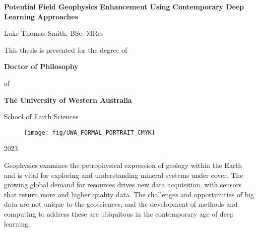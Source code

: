 \documentclass[12pt,a4paper]{report} %
\begin{document}
\begin{titlepage}

    \begin{center}
        \large{\textbf{Potential Field Geophysics Enhancement Using Contemporary Deep Learning Approaches}}

        \vspace{15 mm}
        {\large{Luke Thomas Smith, BSc, MRes}}

        \vspace{15 mm}
        This thesis is presented for the degree of

        \vspace{5 mm}
        \textbf{Doctor of Philosophy}

        of

        \textbf{The University of Western Australia}
        \vspace{5 mm}

        School of Earth Sciences
        \vspace{15 mm}

        \begin{figure}[h]
            \centering{}
            \texttt{[image: fig/UWA\_FORMAL\_PORTRAIT\_CMYK]}
        \end{figure}

        \vspace*{\fill}
        2023
    \end{center}
\end{titlepage}


\setcounter{page}{1}

Geophysics examines the petrophysical expression of geology within the Earth and is vital for exploring and understanding mineral systems under cover.
The growing global demand for resources drives new data acquisition, with sensors that return more and higher quality data.
The challenges and opportunities of big data are not unique to the geosciences, and the development of methods and computing to address these are ubiquitous in the contemporary age of deep learning.
\end{document}
